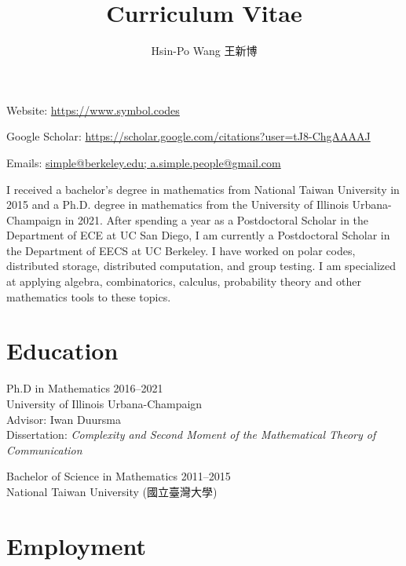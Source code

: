 \documentclass{article}
\def\email#1{\href{mailto:#1}{#1}}
\begin{document}
                                 \title
                           {Curriculum Vitae}
                                    
                                \author
                     {Hsin-Po Wang {\zhfamily 王新博}}
                                    
                         \def\day#1\year{\year}
                                    
                               \maketitle

Website: \url{https://www.symbol.codes}

Google Scholar:
            \url{https://scholar.google.com/citations?user=tJ8-ChgAAAAJ}

Emails: \email{simple@berkeley.edu; a.simple.people@gmail.com}

I received a bachelor's degree in mathematics from National Taiwan
University in 2015 and a Ph.D. degree in mathematics from the University
of Illinois Urbana-Champaign in 2021.  After spending a year as a
Postdoctoral Scholar in the Department of ECE at UC San Diego, I am
currently a Postdoctoral Scholar in the Department of EECS at UC
Berkeley.  I have worked on polar codes, distributed storage,
distributed computation, and group testing.  I am specialized at
applying algebra, combinatorics, calculus, probability theory
and other mathematics tools to these topics.


\section{Education}

Ph.D in Mathematics                                 \hfill 2016--2021 \\
University of Illinois Urbana-Champaign                               \\
Advisor: Iwan Duursma                                                 \\
Dissertation: \emph{Complexity and Second Moment
of the Mathematical Theory of Communication}

Bachelor of Science in Mathematics                  \hfill 2011--2015 \\
National Taiwan University ({\zhfamily 國立臺灣大學})

\section{Employment}
\end{document}

